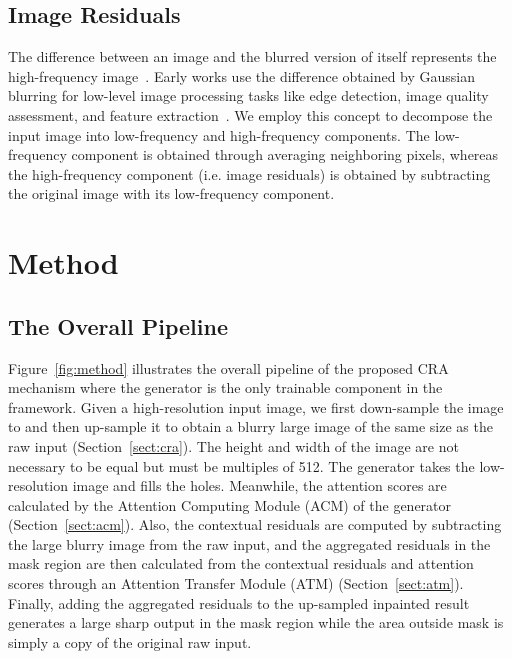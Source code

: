 \documentclass[oribibl]{llncs}  \usepackage[width=122mm,left=12mm,paperwidth=146mm,height=193mm,top=12mm,paperheight=217mm]{geometry}
\begin{document}
\subsection{Image Residuals}
The difference between an image and the blurred version of itself represents the high-frequency image~\cite{burt1983laplacian,denton2015deep}. Early works use the difference obtained by Gaussian blurring for low-level image processing tasks like edge detection, image quality assessment, and feature extraction~\cite{deshmukh2010image,sharifi2002classified,toet1989image}. We employ this concept to decompose the input image into low-frequency and high-frequency components. The low-frequency component is obtained through averaging neighboring pixels, whereas the high-frequency component (i.e. image residuals) is obtained by subtracting the original image with its low-frequency component.


\section{Method}
\subsection{The Overall Pipeline}
Figure~\ref{fig:method} illustrates the overall pipeline of the proposed CRA mechanism where the generator is the only trainable component in the framework. Given a high-resolution input image, we first down-sample the image to  and then up-sample it to obtain a blurry large image of the same size as the raw input (Section~\ref{sect:cra}). The height and width of the image are not necessary to be equal but must be multiples of 512. The generator takes the low-resolution image and fills the holes. Meanwhile, the attention scores are calculated by the Attention Computing Module (ACM) of the generator (Section~\ref{sect:acm}). Also, the contextual residuals are computed by subtracting the large blurry image from the raw input, and the aggregated residuals in the mask region are then calculated from the contextual residuals and attention scores through an Attention Transfer Module (ATM) (Section~\ref{sect:atm}). Finally, adding the aggregated residuals to the up-sampled inpainted result generates a large sharp output in the mask region while the area outside mask is simply a copy of the original raw input.
\end{document}
